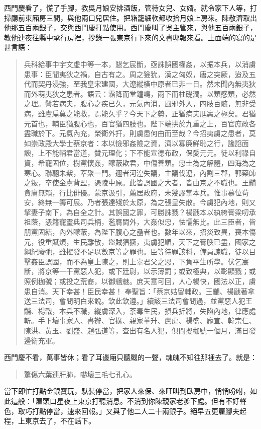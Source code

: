 西門慶看了，慌了手腳，教吳月娘安排酒飯，管待女兒、女婿。就令家下人等，打掃廳前東廂房三間，與他兩口兒居住。把箱籠細軟都收拾月娘上房來。陳敬濟取出他那五百兩銀子，交與西門慶打點使用。西門慶叫了吳主管來，與他五百兩銀子，教他連夜往縣中承行房裡，抄錄一張東京行下來的文書邸報來看。上面端的寫的是甚言語：
\begin{quote}
兵科給事中宇文虛中等一本，懇乞宸斷，亟誅誤國權姦，以振本兵，以消虜患事：臣聞夷狄之禍，自古有之。周之獫狁，漢之匈奴，唐之突厥，迨及五代而契丹浸強，至我皇宋建國，大遼縱橫中原者已非一日。然未聞內無夷狄而外萌夷狄之患者。語云：霜降而堂鐘鳴，雨下而柱礎潤。以類感類，必然之理。譬若病夫，腹心之疾已久，元氣內消，風邪外入，四肢百骸，無非受病，雖盧扁莫之能救，焉能久乎？今天下之勢，正猶病夫尫羸之極矣。君猶元首也，輔臣猶腹心也，百官猶四肢也。陛下端拱於九重之上，百官庶政各盡職於下。元氣內充，榮衛外扞，則虜患何由而至哉？今招夷虜之患者，莫如崇政殿大學士蔡京者：本以憸邪姦險之資，濟以寡廉鮮恥之行，讒諂面諛，上不能輔君當道，贊元理化；下不能宣德布政，保愛元元。徒以利祿自資，希寵固位，樹黨懷姦，矇蔽欺君，中傷善類。忠士為之解體，四海為之寒心。聯翩朱紫，萃聚一門。邇者河湟失議，主議伐遼，內割三郡，郭藥師之叛，卒使金虜背盟，憑陵中原。此皆誤國之大者，皆由京之不職也。王黼貪庸無賴，行比俳優。蒙京汲引，薦居政府，未幾謬掌本兵。惟事慕位苟安，終無一籌可展。乃者張達殘於太原，為之張皇失散。今虜犯內地，則又挈妻子南下，為自全之計。其誤國之罪，可勝誅戮？楊戩本以紈絝膏粱叨承祖蔭，憑籍寵靈典司兵柄，濫膺閫外，大姦似忠，怯懦無比。此三臣者，皆朋黨固結，內外矇蔽，為陛下腹心之蠱者也。數年以來，招災致異，喪本傷元，役重賦煩，生民離散，盜賊猖獗，夷虜犯順，天下之膏腴已盡，國家之綱紀廢弛，雖擢發不足以數京等之罪也。臣等待罪該科，備員諫職，徒以目擊姦臣誤國，而不為皇上陳之，則上辜君父之恩，下負平生所學。伏乞宸斷，將京等一干黨惡人犯，或下廷尉，以示薄罰；或致極典，以彰顯戮；或照例枷號；或投之荒裔，以御魑魅。庶天意可回，人心暢快，國法以正，虜患自消。天下幸甚！臣民幸甚！
奉聖旨：「蔡京姑留輔政。王黼、楊戩著拿送三法司，會問明白來說。欽此欽遵。」續該三法司會問過，並黨惡人犯王黼、楊戩，本兵不職，縱虜深入，荼毒生民，損兵折將，失陷內地，律應處斬。手下壞事家人、書辦、官掾、親家董升、盧虎、楊盛、龐宣、韓宗仁、陳洪、黃玉、劉盛、趙弘道等，查出有名人犯，俱問擬枷號一個月，滿日發邊衛充軍。
\end{quote}

西門慶不看，萬事皆休；看了耳邊廂只聽颼的一聲，魂魄不知往那裡去了。就是：
\begin{quote}
驚傷六葉連肝肺，嚇壞三毛七孔心。
\end{quote}

當下即忙打點金銀寶玩，馱裝停當，把家人來保、來旺叫到臥房中，悄悄吩咐，如此這般：「雇頭口星夜上東京打聽消息。不消到你陳親家老爹下處。但有不好聲色，取巧打點停當，速來回報。」又與了他二人二十兩銀子。絕早五更雇腳夫起程，上東京去了，不在話下。

